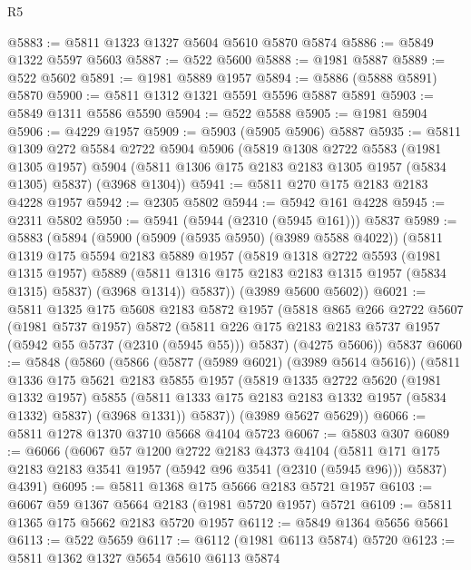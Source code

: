 \begin{lexlean}{R5}
\begin{coremodule}
@5883 := @5811 @1323 @1327 @5604 @5610 @5870 @5874
@5886 := @5849 @1322 @5597 @5603
@5887 := @522 @5600
@5888 := @1981 @5887
@5889 := @522 @5602
@5891 := @1981 @5889 @1957
@5894 := @5886 (@5888 @5891) @5870
@5900 := @5811 @1312 @1321 @5591 @5596 @5887 @5891
@5903 := @5849 @1311 @5586 @5590
@5904 := @522 @5588
@5905 := @1981 @5904
@5906 := @4229 @1957
@5909 := @5903 (@5905 @5906) @5887
@5935 := @5811
    @1309
    @272
    @5584
    @2722
    @5904
    @5906
    (@5819
      @1308
      @2722
      @5583
      (@1981 @1305 @1957)
      @5904
      (@5811 @1306 @175 @2183 @2183 @1305 @1957 (@5834 @1305) @5837)
      (@3968 @1304))
@5941 := @5811 @270 @175 @2183 @2183 @4228 @1957
@5942 := @2305 @5802
@5944 := @5942 @161 @4228
@5945 := @2311 @5802
@5950 := @5941 (@5944 (@2310 (@5945 @161))) @5837
@5989 := @5883
    (@5894
      (@5900
        (@5909 (@5935 @5950) (@3989 @5588 @4022))
        (@5811
          @1319
          @175
          @5594
          @2183
          @5889
          @1957
          (@5819
            @1318
            @2722
            @5593
            (@1981 @1315 @1957)
            @5889
            (@5811 @1316 @175 @2183 @2183 @1315 @1957 (@5834 @1315) @5837)
            (@3968 @1314))
          @5837))
      (@3989 @5600 @5602))
@6021 := @5811
    @1325
    @175
    @5608
    @2183
    @5872
    @1957
    (@5818
      @865
      @266
      @2722
      @5607
      (@1981 @5737 @1957)
      @5872
      (@5811 @226 @175 @2183 @2183 @5737 @1957 (@5942 @55 @5737 (@2310 (@5945 @55))) @5837)
      (@4275 @5606))
    @5837
@6060 := @5848
    (@5860
      (@5866
        (@5877 (@5989 @6021) (@3989 @5614 @5616))
        (@5811
          @1336
          @175
          @5621
          @2183
          @5855
          @1957
          (@5819
            @1335
            @2722
            @5620
            (@1981 @1332 @1957)
            @5855
            (@5811 @1333 @175 @2183 @2183 @1332 @1957 (@5834 @1332) @5837)
            (@3968 @1331))
          @5837))
      (@3989 @5627 @5629))
@6066 := @5811 @1278 @1370 @3710 @5668 @4104 @5723
@6067 := @5803 @307
@6089 := @6066
    (@6067
      @57
      @1200
      @2722
      @2183
      @4373
      @4104
      (@5811 @171 @175 @2183 @2183 @3541 @1957 (@5942 @96 @3541 (@2310 (@5945 @96))) @5837)
      @4391)
@6095 := @5811 @1368 @175 @5666 @2183 @5721 @1957
@6103 := @6067 @59 @1367 @5664 @2183 (@1981 @5720 @1957) @5721
@6109 := @5811 @1365 @175 @5662 @2183 @5720 @1957
@6112 := @5849 @1364 @5656 @5661
@6113 := @522 @5659
@6117 := @6112 (@1981 @6113 @5874) @5720
@6123 := @5811 @1362 @1327 @5654 @5610 @6113 @5874

\end{coremodule}
\end{lexlean}
